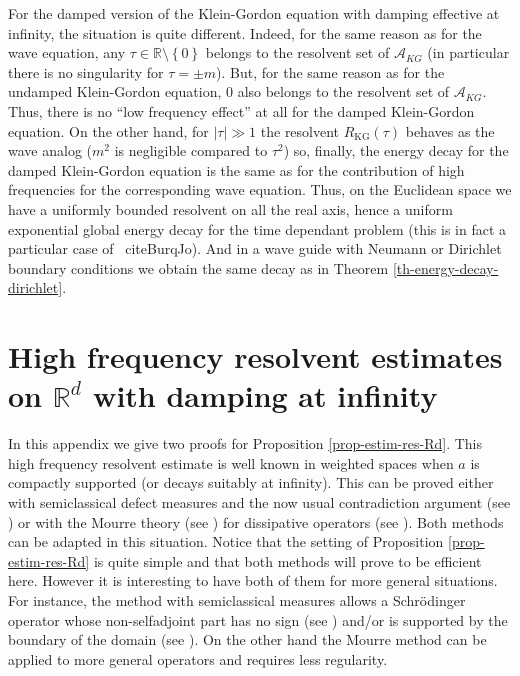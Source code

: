 \documentclass[10pt, a4paper,reqno]{amsart}
\theoremstyle{plain}
\theoremstyle{definition}
\theoremstyle{remark}
\begin{document}
For the damped version of the Klein-Gordon equation with damping effective at infinity, the situation is quite different. Indeed, for the same reason as for the wave equation, any ${\tau} \in {\mathbb{R}} \setminus {\left\{ 0 \right\}}$ belongs to the resolvent set of ${{{\mathcal A}}_{KG}}$ (in particular there is no singularity for ${\tau} = \pm m$). But, for the same reason as for the undamped Klein-Gordon equation, 0 also belongs to the resolvent set of ${{{\mathcal A}}_{KG}}$. Thus, there is no ``low frequency effect'' at all for the damped Klein-Gordon equation. On the other hand, for ${\left\vert {\tau}\right\vert} \gg 1$ the resolvent $R_{\mathrm{KG}}({\tau})$ behaves as the wave analog ($m^2$ is negligible compared to ${\tau}^2$) so, finally, the energy decay for the damped Klein-Gordon equation is the same as for the contribution of high frequencies for the corresponding wave equation. Thus, on the Euclidean space we have a uniformly bounded resolvent on all the real axis, hence a uniform exponential global energy decay for the time dependant problem (this is in fact a particular case of \
cite{BurqJo}). And in a wave guide with Neumann or Dirichlet boundary conditions we obtain the same decay as in Theorem \ref{th-energy-decay-dirichlet}.

\appendix 

\section{High frequency resolvent estimates on \texorpdfstring{${\mathbb{R}}^d$}{Rd} with damping at infinity}  \label{sec-high-freq-Rd}

In this appendix we give two proofs for Proposition \ref{prop-estim-res-Rd}. This high frequency resolvent estimate is well known in weighted spaces when $a$ is compactly supported (or decays suitably at infinity). This can be proved either with semiclassical defect measures and the now usual contradiction argument (see \cite{gerardl93,lebeau96,burq02,jecko04}) or with the Mourre theory (see \cite{mourre83,amrein}) for dissipative operators (see \cite{royer-mourre,boussaidg10,boucletr14,royer-mourre-formes}). Both methods can be adapted in this situation. Notice that the setting of Proposition \ref{prop-estim-res-Rd} is quite simple and that both methods will prove to be efficient here. However it is interesting to have both of them for more general situations. For instance, the method with semiclassical measures allows a Schr\"odinger operator whose non-selfadjoint part has no sign (see \cite{royer-nondiss}) and/or is supported by the boundary of the domain (see \cite{royer-diss-wave-guide}). On the other 
hand the Mourre method can be applied to more general operators and requires less regularity.\\
\end{document}
